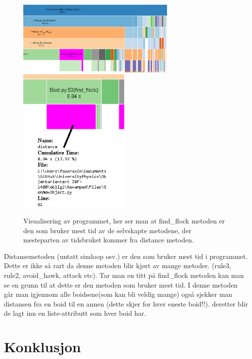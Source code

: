 {\begin{figure}[hbt!]
{\centering
    \includegraphics[width=0.70\textwidth]{systeminfo.png}
    \includegraphics[width=0.50\textwidth]{systeminfo2.png}
    \caption{Visualisering av programmet, her ser man at find\_flock metoden er den som bruker mest tid av de selvskapte metodene, der mesteparten av tidsbruket kommer fra distance metoden.}
    \label{Evaluasjon}
\par}
\end{figure}

Distansemetoden (untatt simloop osv.) er den som bruker mest tid i programmet. Dette er ikke så rart da denne metoden blir kjørt av mange metoder. (rule3, rule2, avoid\_hawk, attack etc). Tar man en titt på find\_flock metoden kan man se en grunn til at dette er den metoden som bruker mest tid. I denne metoden går man igjennom alle boidsene(som kan bli veldig mange) også sjekker man distansen fra en boid til en annen (dette skjer for hver eneste boid!!). deretter blir de lagt inn en liste-attributt som hver boid har.


\section{Konklusjon}

}
